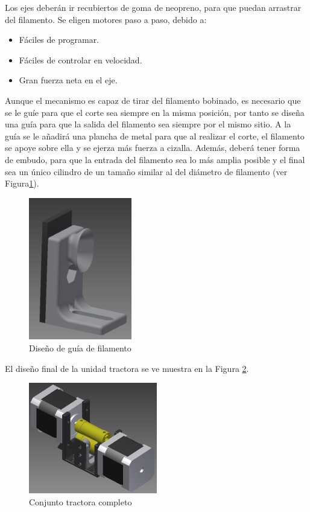 Los ejes deberán ir recubiertos de goma de neopreno, para que puedan arrastrar del filamento. Se eligen motores paso a paso, debido a:

\begin{itemize}
	\item{Fáciles de programar.}
	\item{Fáciles de controlar en velocidad.}
	\item{Gran fuerza neta en el eje.}
\end{itemize}

Aunque el mecanismo es capaz de tirar del filamento bobinado, es necesario que se le guíe para que el corte sea siempre en la misma posición, por tanto se diseña una guía para que la salida del filamento sea siempre por el mismo sitio. A la guía se le añadirá una plancha de metal para que al realizar el corte, el filamento se apoye sobre ella y se ejerza más fuerza a cizalla. Además, deberá tener forma de embudo, para que la entrada del filamento sea lo más amplia posible y el final sea un único cilindro de un tamaño similar al del diámetro de filamento (ver Figura\ref{fig:peletizadora_guia}).

\begin{figure}[H]
    \centering
    \includegraphics[width=0.4\textwidth]{images/peletizadora/guia.png}
    \caption{Diseño de guía de filamento}
    \label{fig:peletizadora_guia}
\end{figure}

El diseño final de la unidad tractora se ve muestra en la Figura \ref{fig:peletizadora_conjunto}.

\begin{figure}[H]
    \centering
    \includegraphics[width=0.5\textwidth]{images/peletizadora/conjunto_tractora.png}
    \caption{Conjunto tractora completo}
    \label{fig:peletizadora_conjunto}
\end{figure}

